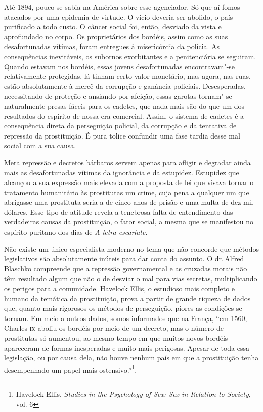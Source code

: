 Até 1894, pouco se sabia na América sobre esse agenciador. Só que aí
fomos atacados por uma epidemia de virtude. O vício deveria ser abolido,
o país purificado a todo custo. O câncer social foi, então, desviado da
vista e aprofundado no corpo. Os proprietários dos bordéis, assim como
as suas desafortunadas vítimas, foram entregues à misericórdia da
polícia. As consequências inevitáveis, os subornos exorbitantes e a
penitenciária se seguiram. Quando estavam nos bordéis, essas jovens
desafortunadas encontravam"-se relativamente protegidas, lá tinham certo
valor monetário, mas agora, nas ruas, estão absolutamente à mercê da
corrupção e ganância policiais. Desesperadas, necessitando de proteção e
ansiando por afeição, essas garotas tornam"-se naturalmente presas fáceis
para os cadetes, que nada mais são do que um dos resultados do espírito de nossa
era comercial. Assim, o sistema de cadetes é a consequência direta da
perseguição policial, da corrupção e da tentativa de repressão da
prostituição. É pura tolice confundir uma fase tardia desse mal social
com a sua causa.

Mera repressão e decretos bárbaros servem apenas para afligir e
degradar ainda mais as desafortunadas vítimas da ignorância e da
estupidez. Estupidez que alcançou a sua expressão mais elevada com a
proposta de lei que visava tornar o tratamento humanitário às prostitutas um
crime, cuja pena a qualquer um que abrigasse uma prostituta seria a de cinco anos de
prisão e uma multa de dez mil dólares. Esse tipo de atitude revela a tenebrosa
falta de entendimento das verdadeiras causas da prostituição,
o fator social, a mesma que se manifestou no espírito puritano
dos dias de \textit{A letra escarlate}.

Não existe um único especialista moderno no tema que não concorde
que métodos legislativos são absolutamente inúteis para dar conta do
assunto. O dr.\,Alfred Blaschko compreende que a repressão governamental
e as cruzadas morais não têm resultado algum que não o de desviar o mal
para vias secretas, multiplicando os perigos para a comunidade. Havelock
Ellis, o estudioso mais completo e humano da temática da prostituição, prova a
partir de grande riqueza de dados que, quanto mais rigorosos os métodos
de perseguição, piores as condições se tornam. Em meio a outros dados,
somos informados que na França, ``em 1560, Charles \textsc{ix} aboliu os bordéis
por meio de um decreto, mas o número de prostitutas só aumentou, ao
mesmo tempo em que muitos novos bordéis apareceram de formas inesperadas
e muito mais perigosas. Apesar de toda essa legislação, ou por causa
dela, não houve nenhum país em que a prostituição tenha desempenhado um
papel mais ostensivo.''\footnote{Havelock Ellis, \textit{Studies in the
  Psychology of Sex: Sex in Relation to Society}, vol. 6}.

